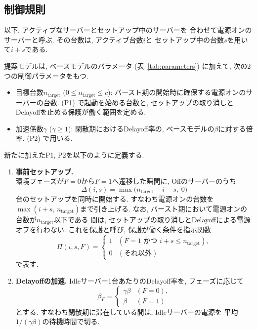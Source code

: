\documentclass[a4paper, 11pt, dvipdfmx]{jsreport}
\begin{document}
\subsection{制御規則}
\label{sec:pred-rules}

以下, アクティブなサーバーとセットアップ中のサーバーを
合わせて電源オンのサーバーと呼ぶ. その台数は, アクティブ台数$i$と
セットアップ中の台数$s$を用いて$i+s$である. 

提案モデルは, ベースモデルのパラメータ (表~\ref{tab:parameters}) に加えて, 
次の2つの制御パラメータをもつ. 
\begin{itemize}
    \item 目標台数$n_{\mathrm{target}}$ ($0 \le n_{\mathrm{target}} \le c$):
    バースト期の開始時に確保する電源オンのサーバーの台数. 
    (P1) で起動を始める台数と, セットアップの取り消しとDelayoffを止める保護が働く範囲を定める. 
    \item 加速係数$\gamma$ ($\gamma \ge 1$):
    閑散期におけるDelayoff率の, ベースモデルの$\beta$に対する倍率. 
    (P2) で用いる. 
\end{itemize}

新たに加えたP1, P2を以下のように定義する. 

\begin{enumerate}
    \item[(P1)] \textbf{事前セットアップ.}\\
    環境フェーズが$F=0$から$F=1$へ遷移した瞬間に, Offのサーバーのうち
    \begin{equation}
        \Delta(i, s) = \max\bigl(n_{\mathrm{target}} - i - s, \; 0\bigr)
        \label{eq:pred-delta}
    \end{equation}
    台のセットアップを同時に開始する. すなわち電源オンの台数を
    $\max(i+s, \, n_{\mathrm{target}})$まで引き上げる. なお, バースト期において電源オンの台数が$n_{\mathrm{target}}$以下である
    間は, セットアップの取り消しとDelayoffによる電源オフを行わない. 
    これを保護と呼び, 保護が働く条件を指示関数
    \begin{equation}
        \Pi(i, s, F) =
        \begin{cases}
            1 & (F = 1 \text{ かつ } i+s \le n_{\mathrm{target}}), \\
            0 & (\text{それ以外})
        \end{cases}
        \label{eq:pred-protect}
    \end{equation}
    で表す. 
 
    \item[(P2)] \textbf{Delayoffの加速.}
    Idleサーバー1台あたりのDelayoff率を, フェーズに応じて
    \begin{equation}
        \beta_F =
        \begin{cases}
            \gamma\beta & (F = 0), \\
            \beta       & (F = 1)
        \end{cases}
        \label{eq:pred-betaF}
    \end{equation}
    とする. すなわち閑散期に滞在している間は, Idleサーバーの電源を
    平均$1/(\gamma\beta)$の待機時間で切る. 
\end{enumerate}
\end{document}
